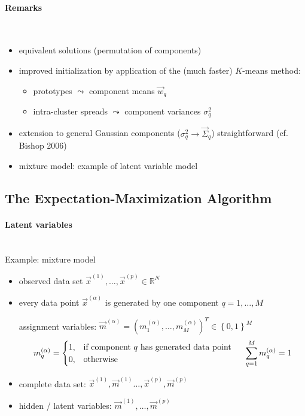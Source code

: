 \paragraph{Remarks}\mbox{}\\
\begin{itemize}
	\item equivalent solutions (permutation of components)
	\vspace{2mm}
	\item improved initialization by application of the (much faster) $K$-means method: 
	\begin{itemize}
		\item prototypes $\leadsto$ component means $\vec{w}_q$
		\item intra-cluster spreads $\leadsto$ component variances $\sigma_q^2$
	\end{itemize}
	\vspace{2mm}
	\item extension to general Gaussian components ($\sigma_q^2 \rightarrow \vec{\Sigma}_q$) straightforward (cf. Bishop 2006)
	\vspace{2mm}
	\item mixture model: example of latent variable model
\end{itemize}

\subsection{The Expectation-Maximization Algorithm}
\paragraph{Latent variables}\mbox{}\\
Example: mixture model
\begin{itemize}
	\item observed data set $\vec{x}^{(1)}, \dots, \vec{x}^{(p)} \in \mathbb{R}^N$
	\item every data point $\vec{x}^{(\alpha)}$ is generated by one component $q=1, \dots, M$
	\begin{itemize}
		\itl assignment variables: $\vec{m}^{(\alpha)} =  \left( m_1^{(\alpha)}, \dots, m_M^{(\alpha)} \right)^T \in \left\{ 0, 1 \right\}^M$ \\
		\begin{equation*}
		m_q^{(\alpha)} = 
		\begin{cases}
		1, & \text{if component } q \text{ has generated data point} \\
		0, & \text{otherwise}
		\end{cases}
		\hspace{0.5cm}
		 \sum_{q=1}^{M} m_q^{(\alpha)} = 1 
		\end{equation*}
	\end{itemize}
	\item complete data set: $\vec{x}^{(1)}, \vec{m}^{(1)} \dots, \vec{x}^{(p)}, \vec{m}^{(p)}$
	\item hidden / latent variables: $\vec{m}^{(1)}, \dots, \vec{m}^{(p)}$
\end{itemize}



